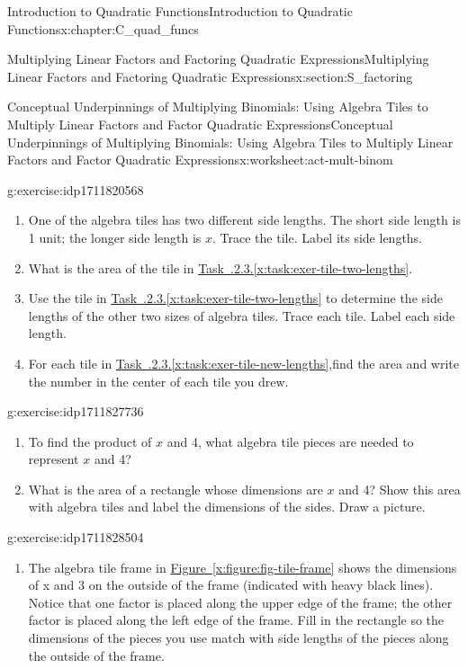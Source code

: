 \documentclass[oneside,10pt,]{book}
\newcommand{\xreffont}{\relax}
\numberwithin{equation}{chapter}
\begin{document}
\begin{chapterptx}{Introduction to Quadratic Functions}{}{Introduction to Quadratic Functions}{}{}{x:chapter:C_quad_funcs}
\begin{sectionptx}{Multiplying Linear Factors and Factoring Quadratic Expressions}{}{Multiplying Linear Factors and Factoring Quadratic Expressions}{}{}{x:section:S_factoring}
\begin{worksheet-subsection}{Conceptual Underpinnings of Multiplying Binomials: Using Algebra Tiles to Multiply Linear Factors and Factor Quadratic Expressions}{}{Conceptual Underpinnings of Multiplying Binomials: Using Algebra Tiles to Multiply Linear Factors and Factor Quadratic Expressions}{}{}{x:worksheet:act-mult-binom}
\begin{divisionexercise}{3}{}{}{g:exercise:idp1711820568}
\begin{enumerate}[font=\bfseries,label=(\alph*),ref=\alph*]
\item\label{x:task:exer-tile-two-lengths}One of the algebra tiles has two different side lengths. The short side length is 1 unit; the longer side length is \(x\). Trace the tile. Label its side lengths.%
\item{}What is the area of the tile in \hyperref[x:task:exer-tile-two-lengths]{Task~{\xreffont 4.3.2.3}.{\xreffont\ref{x:task:exer-tile-two-lengths}}}.%
\item\label{x:task:exer-tile-new-lengths}Use the tile in \hyperref[x:task:exer-tile-two-lengths]{Task~{\xreffont 4.3.2.3}.{\xreffont\ref{x:task:exer-tile-two-lengths}}} to determine the side lengths of the other two sizes of algebra tiles. Trace each tile. Label each side length.%
\item{}For each tile in \hyperref[x:task:exer-tile-new-lengths]{Task~{\xreffont 4.3.2.3}.{\xreffont\ref{x:task:exer-tile-new-lengths}}},find the area and write the number in the center of each tile you drew.%
\end{enumerate}
\end{divisionexercise}%
\begin{divisionexercise}{4}{}{}{g:exercise:idp1711827736}%
\begin{enumerate}[font=\bfseries,label=(\alph*),ref=\alph*]
\item{}To find the product of \(x\) and 4, what algebra tile pieces are needed to represent \(x\) and 4?%
\item{}What is the area of a rectangle whose dimensions are \(x\) and 4? Show this area with algebra tiles and label the dimensions of the sides. Draw a picture.%
\end{enumerate}
\end{divisionexercise}%
\begin{divisionexercise}{5}{}{}{g:exercise:idp1711828504}%
\begin{enumerate}[font=\bfseries,label=(\alph*),ref=\alph*]
\item\label{x:task:exer-tile-frame}The algebra tile frame in \hyperref[x:figure:fig-tile-frame]{Figure~{\xreffont\ref{x:figure:fig-tile-frame}}} shows the dimensions of x and 3 on the outside of the frame (indicated with heavy black lines). Notice that one factor is placed along the upper edge of the frame; the other factor is placed along the left edge of the frame. Fill in the rectangle so the dimensions of the pieces you use match with side lengths of the pieces along the outside of the frame.%

\end{enumerate}
\end{divisionexercise}
\end{worksheet-subsection}
\end{sectionptx}
\end{chapterptx}
\end{document}
